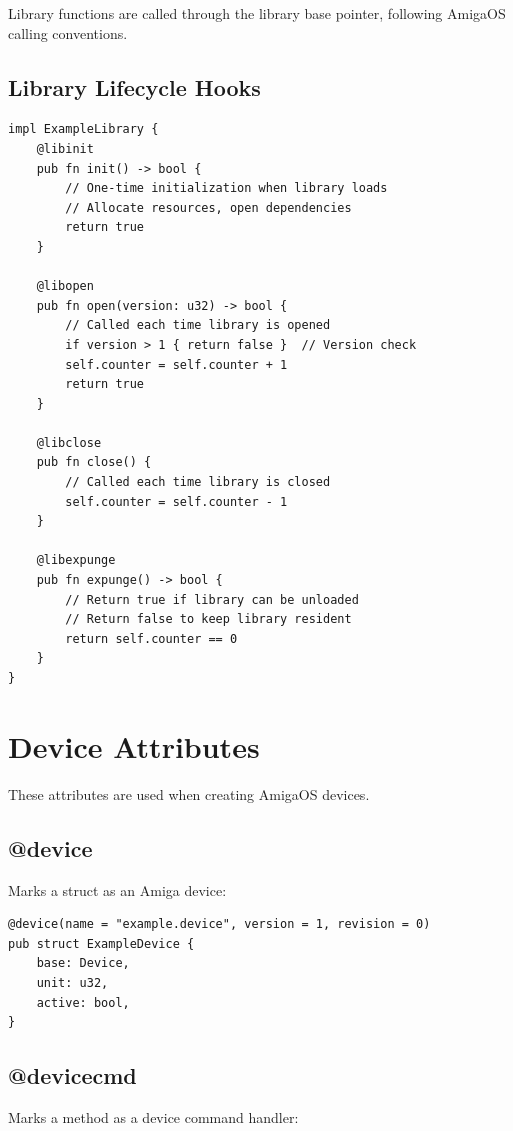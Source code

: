 Library functions are called through the library base pointer, following AmigaOS calling conventions.

\subsection{Library Lifecycle Hooks}

\begin{lstlisting}
impl ExampleLibrary {
    @libinit
    pub fn init() -> bool {
        // One-time initialization when library loads
        // Allocate resources, open dependencies
        return true
    }

    @libopen
    pub fn open(version: u32) -> bool {
        // Called each time library is opened
        if version > 1 { return false }  // Version check
        self.counter = self.counter + 1
        return true
    }

    @libclose
    pub fn close() {
        // Called each time library is closed
        self.counter = self.counter - 1
    }

    @libexpunge
    pub fn expunge() -> bool {
        // Return true if library can be unloaded
        // Return false to keep library resident
        return self.counter == 0
    }
}
\end{lstlisting}

\section{Device Attributes}
\label{sec:device-attributes}

These attributes are used when creating AmigaOS devices.

\subsection{@device}

Marks a struct as an Amiga device:

\begin{lstlisting}
@device(name = "example.device", version = 1, revision = 0)
pub struct ExampleDevice {
    base: Device,
    unit: u32,
    active: bool,
}
\end{lstlisting}

\subsection{@devicecmd}

Marks a method as a device command handler:

